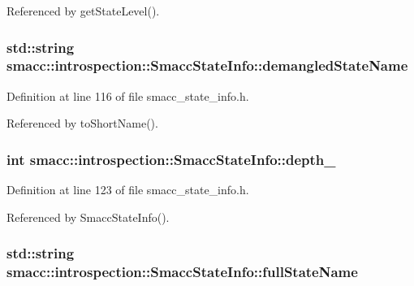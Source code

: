 Referenced by get\+State\+Level().

\subsubsection[{\texorpdfstring{demangled\+State\+Name}{demangledStateName}}]{\setlength{\rightskip}{0pt plus 5cm}std\+::string smacc\+::introspection\+::\+Smacc\+State\+Info\+::demangled\+State\+Name}\hypertarget{classsmacc_1_1introspection_1_1SmaccStateInfo_acf0014a819c23caad085ba6df13a17bf}{}\label{classsmacc_1_1introspection_1_1SmaccStateInfo_acf0014a819c23caad085ba6df13a17bf}


Definition at line 116 of file smacc\+\_\+state\+\_\+info.\+h.



Referenced by to\+Short\+Name().

\subsubsection[{\texorpdfstring{depth\+\_\+}{depth_}}]{\setlength{\rightskip}{0pt plus 5cm}int smacc\+::introspection\+::\+Smacc\+State\+Info\+::depth\+\_\+}\hypertarget{classsmacc_1_1introspection_1_1SmaccStateInfo_a7e97a482ca49057f27e638268d1a3189}{}\label{classsmacc_1_1introspection_1_1SmaccStateInfo_a7e97a482ca49057f27e638268d1a3189}


Definition at line 123 of file smacc\+\_\+state\+\_\+info.\+h.



Referenced by Smacc\+State\+Info().

\subsubsection[{\texorpdfstring{full\+State\+Name}{fullStateName}}]{\setlength{\rightskip}{0pt plus 5cm}std\+::string smacc\+::introspection\+::\+Smacc\+State\+Info\+::full\+State\+Name}\hypertarget{classsmacc_1_1introspection_1_1SmaccStateInfo_aef6053863f757bf9af16fe4da75c51de}{}\label{classsmacc_1_1introspection_1_1SmaccStateInfo_aef6053863f757bf9af16fe4da75c51de}


